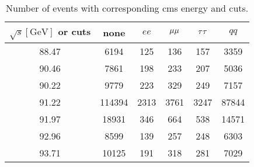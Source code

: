 \begin{table}[ht]
	\centering
	\begin{tabular}{c|ccccc}
		\toprule
		$\sqrt{s} [\si{\giga\eV}]$ or cuts& none & $ee$ & $\mu\mu$ & $\tau\tau$ & $qq$ \\
	\midrule
	\num{88.47} & \num{6194} & \num{125} & \num{136} & \num{157} & \num{3359}\\
	\num{90.46} & \num{7861} & \num{198} & \num{233} & \num{207} & \num{5036}\\
	\num{90.22} & \num{9779} & \num{223} & \num{329} & \num{249} & \num{7157}\\
	\num{91.22} & \num{114394} & \num{2313} & \num{3761} & \num{3247} & \num{87844}\\
	\num{91.97} & \num{18931} & \num{346} & \num{664} & \num{538} & \num{14571}\\
	\num{92.96} & \num{8599} & \num{139} & \num{257} & \num{248} & \num{6303}\\
	\num{93.71} & \num{10125} & \num{191} & \num{318} & \num{281} & \num{7029}\\
	\bottomrule
	\end{tabular}
	\caption{Number of events with corresponding cms energy and cuts.}
	\label{tab:510raw}
\end{table}


